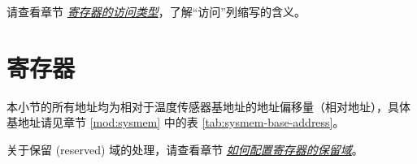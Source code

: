 \documentclass[main\_\_CN.tex]{subfiles}
\begin{document}
请查看章节 \hyperref[glossary-access-types]{\textit{寄存器的访问类型}}，了解“访问”列缩写的含义。






\clearpage
\section{寄存器}

本小节的所有地址均为相对于温度传感器基地址的地址偏移量（相对地址），具体基地址请见章节 \ref{mod:sysmem} \textit{} 中的表 \ref{tab:sysmem-base-address}。

关于保留 (reserved) 域的处理，请查看章节 \hyperref[programming-reserved-field]{\textit{如何配置寄存器的保留域}}。


\end{document}
